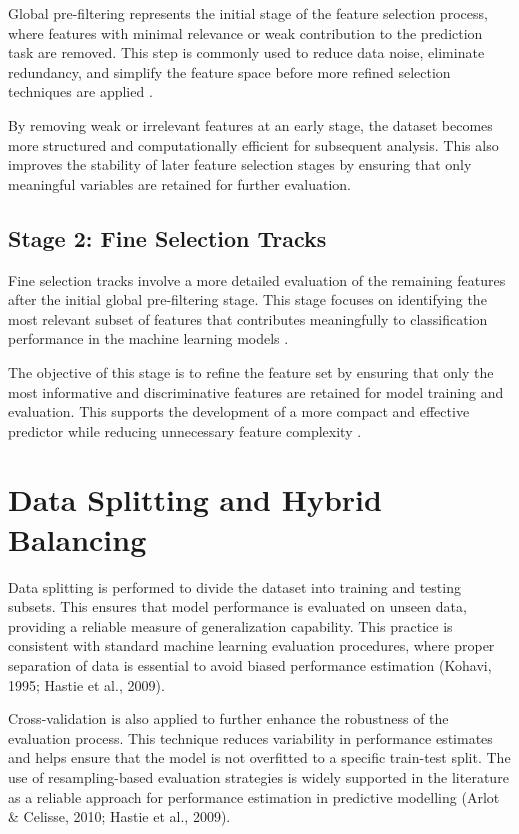 Global pre-filtering represents the initial stage of the feature selection process, where features with minimal relevance or weak contribution to the prediction task are removed. This step is commonly used to reduce data noise, eliminate redundancy, and simplify the feature space before more refined selection techniques are applied \parencite{IEEE10788781}.

By removing weak or irrelevant features at an early stage, the dataset becomes more structured and computationally efficient for subsequent analysis. This also improves the stability of later feature selection stages by ensuring that only meaningful variables are retained for further evaluation.

\subsection{Stage 2: Fine Selection Tracks}

Fine selection tracks involve a more detailed evaluation of the remaining features after the initial global pre-filtering stage. This stage focuses on identifying the most relevant subset of features that contributes meaningfully to classification performance in the machine learning models \parencite{Guyon2003FeatureSelection}.

The objective of this stage is to refine the feature set by ensuring that only the most informative and discriminative features are retained for model training and evaluation. This supports the development of a more compact and effective predictor while reducing unnecessary feature complexity \parencite{Guyon2003FeatureSelection}.
\section{Data Splitting and Hybrid Balancing}

Data splitting is performed to divide the dataset into training and testing subsets. This ensures that model performance is evaluated on unseen data, providing a reliable measure of generalization capability. This practice is consistent with standard machine learning evaluation procedures, where proper separation of data is essential to avoid biased performance estimation (Kohavi, 1995; Hastie et al., 2009).

Cross-validation is also applied to further enhance the robustness of the evaluation process. This technique reduces variability in performance estimates and helps ensure that the model is not overfitted to a specific train-test split. The use of resampling-based evaluation strategies is widely supported in the literature as a reliable approach for performance estimation in predictive modelling (Arlot & Celisse, 2010; Hastie et al., 2009).

